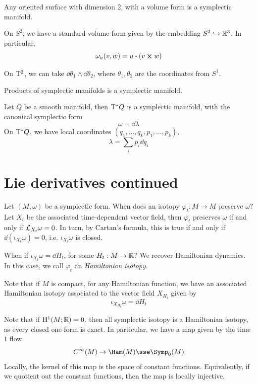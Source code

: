\documentclass{article}
\begin{document}
\begin{example}
    Any oriented surface with dimension 2, with a volume form is a symplectic manifold.

    On \(S^2\), we have a standard volume form given by the embedding \(S^2 \hookrightarrow \mathbb{R}^3\). In particular,
    \[\omega_u(v, w) = u \vdot (v \cross w)\]

    On \(\mathrm{T}^2\),  we can take \(\dd \theta_1 \wedge \dd\theta_2\), where \(\theta_1, \theta_2\) are the coordinates from \(S^1\).
\end{example}

\begin{example}
    Products of symplectic manifolds is a symplectic manifold.
\end{example}

\begin{example}
    Let \(Q\) be a smooth manifold, then \(\mathrm{T}^*Q\) is a symplectic manifold, with the canonical symplectic form
    \[\omega = \dd\lambda\]
    On \(\mathrm{T}^*Q\), we have local coordinates \((q_1, \dots, q_k, p_1, \dots, p_k)\),
    \[\lambda = \sum_i p_i\dd q_i\]
\end{example}

\section{Lie derivatives continued}

Let \((M, \omega)\) be a symplectic form. When does an isotopy \(\varphi_t : M \to M\) preserve \(\omega\)? Let \(X_t\) be the associated time-dependent vector field, then \(\varphi_t\) preserves \(\omega\) if and only if \(\mathcal{L}_{X_t}\omega = 0\). In turn, by Cartan's formula, this is true if and only if \(\dd(\iota_{X_t}\omega) = 0\), i.e. \(\iota_{X_t}\omega\) is closed.

When if \(\iota_{X_t}\omega = \dd H_t\), for some \(H_t : M \to \mathbb{R}\)? We recover Hamiltonian dynamics. In this case, we call \(\varphi_t\) an \emph{Hamiltonian isotopy}.

Note that if \(M\) is compact, for any Hamiltonian function, we have an associated Hamiltonian isotopy associated to the vector field \(X_{H_t}\) given by
\[\iota_{X_{H_t}}\omega = \dd H_t\]

Note that if \(\mathrm{H}^1(M; \mathbb{R}) = 0\), then all symplectic isotopy is a Hamiltonian isotopy, as every closed one-form is exact. In particular, we have a map given by the time \(1\) flow
\[C^\infty(M)\to \Ham(M) \sse \Symp_0(M)\]
Locally, the kernel of this map is the space of constant functions. Equivalently, if we quotient out the constant functions, then the map is locally injective.
\end{document}
